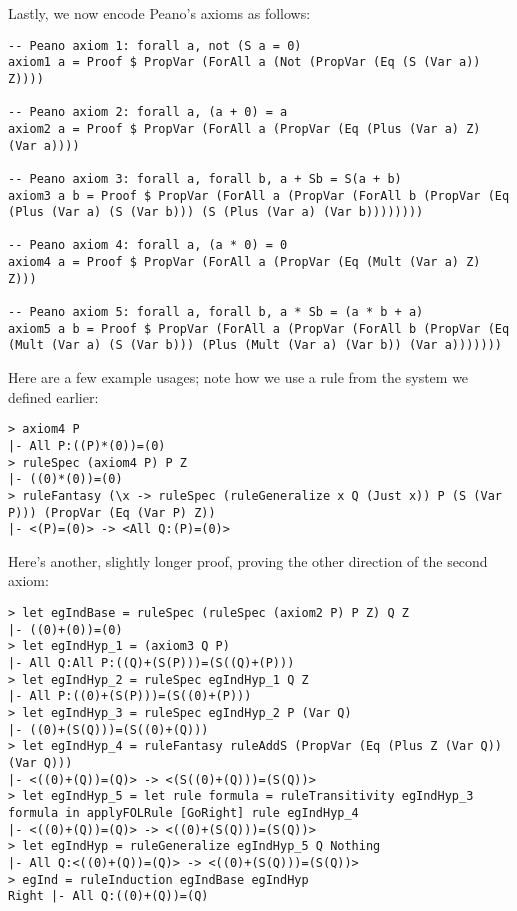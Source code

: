 \documentclass{article}
\begin{document}
Lastly, we now encode Peano’s axioms as follows:

\begin{lstlisting}
-- Peano axiom 1: forall a, not (S a = 0)
axiom1 a = Proof $ PropVar (ForAll a (Not (PropVar (Eq (S (Var a)) Z))))

-- Peano axiom 2: forall a, (a + 0) = a
axiom2 a = Proof $ PropVar (ForAll a (PropVar (Eq (Plus (Var a) Z) (Var a))))

-- Peano axiom 3: forall a, forall b, a + Sb = S(a + b)
axiom3 a b = Proof $ PropVar (ForAll a (PropVar (ForAll b (PropVar (Eq (Plus (Var a) (S (Var b))) (S (Plus (Var a) (Var b))))))))

-- Peano axiom 4: forall a, (a * 0) = 0
axiom4 a = Proof $ PropVar (ForAll a (PropVar (Eq (Mult (Var a) Z) Z)))

-- Peano axiom 5: forall a, forall b, a * Sb = (a * b + a)
axiom5 a b = Proof $ PropVar (ForAll a (PropVar (ForAll b (PropVar (Eq (Mult (Var a) (S (Var b))) (Plus (Mult (Var a) (Var b)) (Var a)))))))
\end{lstlisting}

Here are a few example usages; note how we use a rule from the system we defined earlier:

\begin{lstlisting}
> axiom4 P
|- All P:((P)*(0))=(0)
> ruleSpec (axiom4 P) P Z
|- ((0)*(0))=(0)
> ruleFantasy (\x -> ruleSpec (ruleGeneralize x Q (Just x)) P (S (Var P))) (PropVar (Eq (Var P) Z))
|- <(P)=(0)> -> <All Q:(P)=(0)>
\end{lstlisting}

Here's another, slightly longer proof, proving the other direction of the second axiom:

\begin{lstlisting}
> let egIndBase = ruleSpec (ruleSpec (axiom2 P) P Z) Q Z
|- ((0)+(0))=(0)
> let egIndHyp_1 = (axiom3 Q P)
|- All Q:All P:((Q)+(S(P)))=(S((Q)+(P)))
> let egIndHyp_2 = ruleSpec egIndHyp_1 Q Z
|- All P:((0)+(S(P)))=(S((0)+(P)))
> let egIndHyp_3 = ruleSpec egIndHyp_2 P (Var Q)
|- ((0)+(S(Q)))=(S((0)+(Q)))
> let egIndHyp_4 = ruleFantasy ruleAddS (PropVar (Eq (Plus Z (Var Q)) (Var Q)))
|- <((0)+(Q))=(Q)> -> <(S((0)+(Q)))=(S(Q))>
> let egIndHyp_5 = let rule formula = ruleTransitivity egIndHyp_3 formula in applyFOLRule [GoRight] rule egIndHyp_4
|- <((0)+(Q))=(Q)> -> <((0)+(S(Q)))=(S(Q))>
> let egIndHyp = ruleGeneralize egIndHyp_5 Q Nothing
|- All Q:<((0)+(Q))=(Q)> -> <((0)+(S(Q)))=(S(Q))>
> egInd = ruleInduction egIndBase egIndHyp
Right |- All Q:((0)+(Q))=(Q)
\end{lstlisting}
\end{document}
